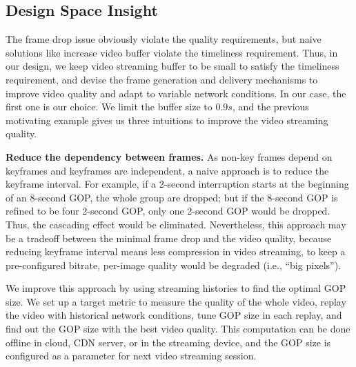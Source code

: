 \subsection{Design Space Insight}
The frame drop issue obviously violate the quality requirements, but naive solutions like increase video buffer violate the timeliness requirement. Thus, in our design, we keep video streaming buffer to be small to satisfy the timeliness requirement, and devise the frame generation and delivery mechanisms to improve video quality and adapt to variable network conditions. In our case, the first one is our choice. We limit the buffer size to $0.9s$, and the previous motivating example gives us three intuitions to improve the video streaming quality.


\textbf{Reduce the dependency between frames.}
As non-key frames depend on keyframes and keyframes are independent, a naive approach is to reduce the keyframe interval. For example, if a 2-second interruption starts at the beginning of an 8-second GOP, the whole group are dropped; but if the 8-second GOP is refined to be four 2-second GOP, only one 2-second GOP would be dropped. Thus, the cascading effect would be eliminated. Nevertheless, this approach may be a tradeoff between the minimal frame drop and the video quality, because reducing keyframe interval means less compression in video streaming, to keep a pre-configured bitrate, per-image quality would be degraded (i.e., ``big pixels'').

We improve this approach by using streaming histories to find the optimal GOP size. We set up a target metric to measure the quality of the whole video, replay the video with historical network conditions, tune GOP size in each replay, and find out the GOP size with the best video quality. This computation can be done offline in cloud, CDN server, or in the streaming device, and the GOP size is configured as a parameter for next video streaming session.

